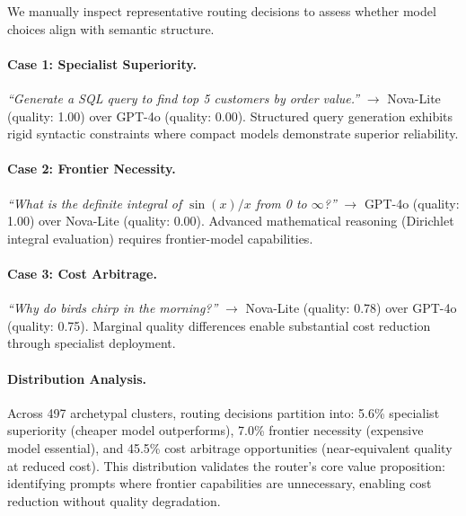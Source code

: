 We manually inspect representative routing decisions to assess whether model choices align with semantic structure.

\paragraph{Case 1: Specialist Superiority.} \emph{``Generate a SQL query to find top 5 customers by order value.''} $\to$ Nova-Lite (quality: 1.00) over GPT-4o (quality: 0.00). Structured query generation exhibits rigid syntactic constraints where compact models demonstrate superior reliability.

\paragraph{Case 2: Frontier Necessity.} \emph{``What is the definite integral of $\sin(x)/x$ from 0 to $\infty$?''} $\to$ GPT-4o (quality: 1.00) over Nova-Lite (quality: 0.00). Advanced mathematical reasoning (Dirichlet integral evaluation) requires frontier-model capabilities.

\paragraph{Case 3: Cost Arbitrage.} \emph{``Why do birds chirp in the morning?''} $\to$ Nova-Lite (quality: 0.78) over GPT-4o (quality: 0.75). Marginal quality differences enable substantial cost reduction through specialist deployment.

\paragraph{Distribution Analysis.} Across 497 archetypal clusters, routing decisions partition into: 5.6\% specialist superiority (cheaper model outperforms), 7.0\% frontier necessity (expensive model essential), and 45.5\% cost arbitrage opportunities (near-equivalent quality at reduced cost). This distribution validates the router's core value proposition: identifying prompts where frontier capabilities are unnecessary, enabling cost reduction without quality degradation.
